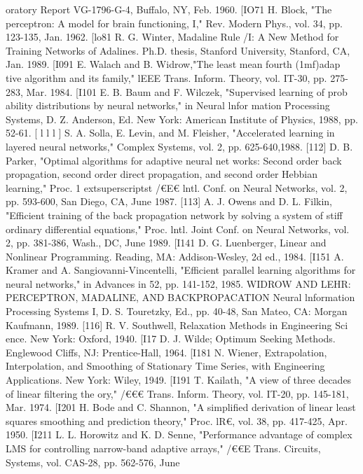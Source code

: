 \documentclass[11pt,a4paper,twocolumn]{article}
\begin{document}
{{oratory Report VG-1796-G-4, Buffalo, NY, Feb. 1960. 
[IO71 H. Block, "The perceptron: A model for brain functioning, 
I," Rev. Modern Phys., vol. 34, pp. 123-135, Jan. 1962. 
[lo81 R. G. Winter, Madaline Rule /I: A New Method for Training 
Networks of Adalines. Ph.D. thesis, Stanford University, 
Stanford, CA, Jan. 1989. 
[I091 E. Walach and B. Widrow,"The least mean fourth (1mf)adap
tive algorithm and its family," lEEE Trans. Inform. Theory, 
vol. IT-30, pp. 275-283, Mar. 1984. 
[I101 E. B. Baum and F. Wilczek, "Supervised learning of prob
ability distributions by neural networks," in Neural lnfor
mation Processing Systems, D. Z. Anderson, Ed. New York: 
American Institute of Physics, 1988, pp. 52-61. 
[ l l l ]  S. A. Solla, E. Levin, and M. Fleisher, "Accelerated learning 
in layered neural networks," Complex Systems, vol. 2, pp. 
625-640,1988. 
[112] D. B. Parker, "Optimal algorithms for adaptive neural net
works: Second order back propagation, second order direct 
propagation, and second order Hebbian learning," Proc. 1	extsuperscript{st} 
/€E€ lntl. Conf. on Neural Networks, vol. 2, pp. 593-600, San 
Diego, CA, June 1987. 
[113] A. J. Owens and D. L. Filkin, "Efficient training of the back 
propagation network by solving a system of stiff ordinary 
differential equations," Proc. lntl. Joint Conf. on Neural 
Networks, vol. 2, pp. 381-386, Wash., DC, June 1989. 
[I141 D. G. Luenberger, Linear and Nonlinear Programming. 
Reading, MA: Addison-Wesley, 2d ed., 1984. 
[I151 A. Kramer and A. Sangiovanni-Vincentelli, "Efficient parallel 
learning algorithms for neural networks," in Advances in 
52, pp. 141-152, 1985. 
WIDROW AND LEHR: PERCEPTRON, MADALINE, AND BACKPROPACATION 
Neural lnformation Processing Systems I, D. S. Touretzky, 
Ed., pp. 40-48, San Mateo, CA: Morgan Kaufmann, 1989. 
[116] R. V. Southwell, Relaxation Methods in Engineering Sci
ence. New York: Oxford, 1940. 
[I17 D. J. Wilde; Optimum Seeking Methods. Englewood Cliffs, 
NJ: Prentice-Hall, 1964. 
[I181 N. Wiener, Extrapolation, Interpolation, and Smoothing of 
Stationary Time Series, with Engineering Applications. New 
York: Wiley, 1949. 
[I191 T. Kailath, "A view of three decades of linear filtering the
ory," /€€€ Trans. Inform. Theory, vol. IT-20, pp. 145-181, Mar. 
1974. 
[I201 H. Bode and C. Shannon, "A simplified derivation of linear 
least squares smoothing and prediction theory," Proc. lR€, 
vol. 38, pp. 417-425, Apr. 1950. 
[I211 L. L. Horowitz and K. D. Senne, "Performance advantage of 
complex LMS for controlling narrow-band adaptive arrays," 
/€€E Trans. Circuits, Systems, vol. CAS-28, pp. 562-576, June 
}}
\end{document}
